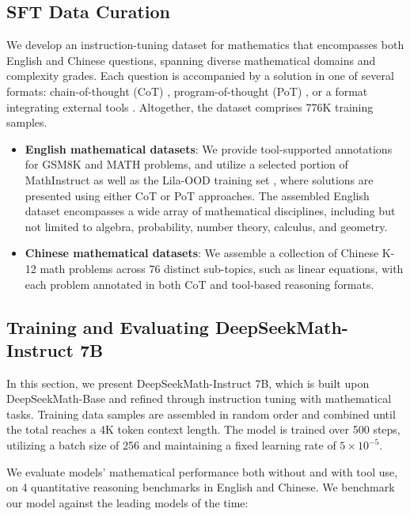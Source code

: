 \begin{itemize}[topsep=0pt]
\subsection{SFT Data Curation}

We develop an instruction-tuning dataset for mathematics that encompasses both English and Chinese questions, spanning diverse mathematical domains and complexity grades. Each question is accompanied by a solution in one of several formats: chain-of-thought (CoT) \citep{cot}, program-of-thought (PoT) \citep{pot,pal}, or a format integrating external tools \citep{tora}. Altogether, the dataset comprises 776K training samples.

\begin{itemize}[topsep=0pt]
    \item \textbf{English mathematical datasets}: We provide tool-supported annotations for GSM8K and MATH problems, and utilize a selected portion of MathInstruct \citep{MathInstruct} as well as the Lila-OOD training set \citep{lila}, where solutions are presented using either CoT or PoT approaches. The assembled English dataset encompasses a wide array of mathematical disciplines, including but not limited to algebra, probability, number theory, calculus, and geometry.
    \item \textbf{Chinese mathematical datasets}: We assemble a collection of Chinese K-12 math problems across 76 distinct sub-topics, such as linear equations, with each problem annotated in both CoT and tool-based reasoning formats.
\end{itemize}

\subsection{Training and Evaluating DeepSeekMath-Instruct 7B}

In this section, we present DeepSeekMath-Instruct 7B, which is built upon DeepSeekMath-Base and refined through instruction tuning with mathematical tasks. Training data samples are assembled in random order and combined until the total reaches a 4K token context length. The model is trained over 500 steps, utilizing a batch size of 256 and maintaining a fixed learning rate of $5\times10^{-5}$.

We evaluate models' mathematical performance both without and with tool use, on 4 quantitative reasoning benchmarks in English and Chinese. We benchmark our model against the leading models of the time:


\end{itemize}
